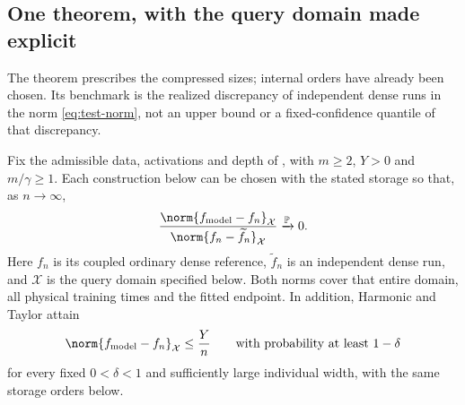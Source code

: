 \subsection{One theorem, with the query domain made explicit}
\label{sec:alltime}

The theorem prescribes the compressed sizes; internal orders have already
been chosen. Its benchmark is the realized discrepancy of independent
dense runs in the norm \eqref{eq:test-norm}, not an upper bound or a
fixed-confidence quantile of that discrepancy.

\begin{theorem}
\label{thm:compression}
Fix the admissible data, activations and depth of , with
$m\ge2$, $Y>0$ and $m/\gamma\ge1$. Each construction below can be
chosen with the stated storage so that, as $n\to\infty$,
\begin{equation}
 \frac{\norm{f_{\mathrm{model}}-f_n}_{\mathcal X}}
      {\norm{f_n-\widetilde f_n}_{\mathcal X}}
 \xrightarrow{\mathbb P}0.
 \label{eq:common-compression}
\end{equation}
Here $f_n$ is its coupled ordinary dense reference, $\widetilde f_n$
is an independent dense run, and $\mathcal X$ is the query domain
specified below. Both norms cover that entire domain, all physical
training times and the fitted endpoint. In addition, Harmonic and
Taylor attain
\begin{equation}
 \norm{f_{\mathrm{model}}-f_n}_{\mathcal X}\le\frac Yn
 \qquad\text{with probability at least }1-\delta
 \label{eq:selected-absolute-accuracy}
\end{equation}
for every fixed $0<\delta<1$ and sufficiently large individual width,
with the same storage orders below.


\end{theorem}
